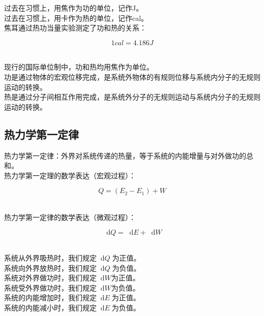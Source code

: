 \documentclass[UTF8]{ctexart}
\newcommand*{\dif}{\mathop{}\!\mathrm{d}}
\begin{document}
\newpage

    过去在习惯上，用焦作为功的单位，记作\si{J}。\\[3mm]
    过去在习惯上，用卡作为热的单位，记作\si{cal}。\\[3mm]
    焦耳通过热功当量实验测定了功和热的关系：
    \begin{large}
        \begin{equation*}
            1\si{cal}=4.186\si{J}
        \end{equation*}
    \end{large}\\
    现行的国际单位制中，功和热均用焦作为单位。\\[3mm]
    功是通过物体的宏观位移完成，是系统外物体的有规则位移与系统内分子的无规则运动的转换。\\[3mm]
    热是通过分子间相互作用完成，是系统外分子的无规则运动与系统内分子的无规则运动的转换。\\

\subsection{热力学第一定律}
    热力学第一定律：外界对系统传递的热量，等于系统的内能增量与对外做功的总和。\\[3mm]
    热力学第一定理的数学表达（宏观过程）：
    \begin{large}
        \begin{equation*}
            Q=(E_2-E_1)+W
        \end{equation*}
    \end{large}\\
    热力学第一定律的数学表达（微观过程）：
    \begin{large}
        \begin{equation*}
            \dif Q=\dif E+\dif W
        \end{equation*}
    \end{large}\\
    系统从外界吸热时，我们规定$\dif Q\;$为正值。\\[3mm]
    系统向外界放热时，我们规定$\dif Q\;$为负值。\\[3mm]
    系统对外界做功时，我们规定$\dif W$为正值。\\[3mm]
    系统受外界做功时，我们规定$\dif W$为负值。\\[3mm]
    系统的内能增加时，我们规定$\dif E\;$为正值。\\[3mm]
    系统的内能减小时，我们规定$\dif E\;$为负值。
\end{document}
